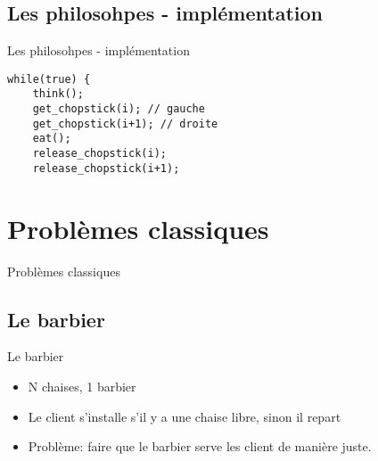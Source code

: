 \begin{frame}[containsverbatim]{\sectitle}
\def\subsectitle{Les philosohpes - implémentation}
\subsection{\subsectitle}
\begin{exampleblock}{\subsectitle}
\begin{verbatim}
while(true) {
    think();
    get_chopstick(i); // gauche
    get_chopstick(i+1); // droite
    eat();
    release_chopstick(i);
    release_chopstick(i+1);
\end{verbatim}
\end{exampleblock}
\end{frame}


\def\sectitle{Problèmes classiques}
\section{\sectitle}
\begin{frame}{\sectitle}
    \def\subsectitle{Le barbier}
    \subsection{\subsectitle}
    \begin{block}{\subsectitle}
        \begin{itemize}
            \item N chaises, 1 barbier
            \item Le client s'installe s'il y a une chaise libre, sinon il repart
            \item Problème: faire que le barbier serve les client de manière juste.
        \end{itemize}
    \end{block}
\end{frame}


\def\sectitle{Éviter l'attente active}
